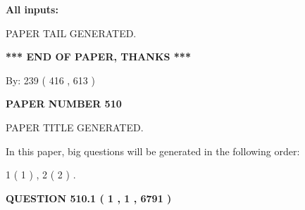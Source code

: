 \documentclass[12pt]{article}
\begin{document}
   
   
   
\noindent{}
   
   
   
   
\noindent\vspace{0.1in}\hspace{-0.08in} {\textbf{\Large{All inputs: }}}
   
   
   
   
   
   
 \vspace{0.2in}
 
   
   
\vspace{2.0in} PAPER TAIL GENERATED.
   
   
   
   
\vspace{1.0in} 
{\textbf{\large{ *** END OF PAPER, THANKS *** }}} 
   
   
\hspace{1.0in} By: 
 239 ( 416 ,  613 )
   
   
   
   
\newpage 
\setcounter{page}{ 
   510001 } 
   
   
   
   
 {\textbf{ \Large{ PAPER NUMBER  510  }}}
   
   
\vspace{0.2in}
   
   
   
   
   
   
   
   
 \vspace{0.2in}
 
 
 
 
   
   
 PAPER TITLE GENERATED.
   
   
   
\vspace{0.2in}
   
In this paper, big questions will be generated in the following order: 
   
   
   1 ( 1 )
 ,
   2 ( 2 )
 .
  
\vspace{0.2in}
  
{\textbf{\Large{QUESTION
510.1 
 ( 1 , 1 , 6791 )
}}}
  
\end{document}
